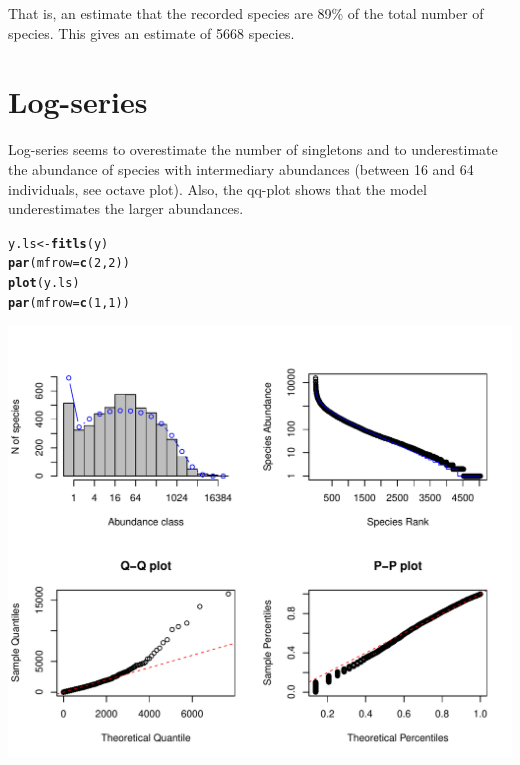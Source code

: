 \documentclass[12pt, A4]{article}\usepackage[]{graphicx}\usepackage[]{color}
\makeatletter
\def\maxwidth{ %
  \ifdim\Gin@nat@width>\linewidth
    \linewidth
  \else
    \Gin@nat@width
  \fi
}
\newcommand{\hlnum}[1]{\textcolor[rgb]{0.686,0.059,0.569}{#1}}%
\newcommand{\hlstd}[1]{\textcolor[rgb]{0.345,0.345,0.345}{#1}}%
\newcommand{\hlkwb}[1]{\textcolor[rgb]{0.69,0.353,0.396}{#1}}%
\newcommand{\hlkwc}[1]{\textcolor[rgb]{0.333,0.667,0.333}{#1}}%
\newcommand{\hlkwd}[1]{\textcolor[rgb]{0.737,0.353,0.396}{\textbf{#1}}}%
\newenvironment{kframe}{%
 \def\at@end@of@kframe{}%
 \ifinner\ifhmode%
  \def\at@end@of@kframe{\end{minipage}}%
  \begin{minipage}{\columnwidth}%
 \fi\fi%
 \def\FrameCommand##1{\hskip\@totalleftmargin \hskip-\fboxsep
 \colorbox{shadecolor}{##1}\hskip-\fboxsep
     \hskip-\linewidth \hskip-\@totalleftmargin \hskip\columnwidth}%
 \MakeFramed {\advance\hsize-\width
   \@totalleftmargin\z@ \linewidth\hsize
   \@setminipage}}%
 {\par\unskip\endMakeFramed%
 \at@end@of@kframe}
\newenvironment{knitrout}{}{} %
\makeatother
\begin{document}
That is, an estimate that the recorded species are 89\%
of the total number of species.
This gives an estimate of 5668 species.


\section{Log-series}

Log-series seems to overestimate the number of singletons
and to underestimate the abundance of species with intermediary abundances
(between 16 and 64 individuals, see octave plot). Also, the qq-plot shows that
the model underestimates the larger abundances.

 
\begin{knitrout}
\color{fgcolor}\begin{kframe}
\begin{alltt}
\hlstd{y.ls} \hlkwb{<-} \hlkwd{fitls}\hlstd{(y)}
\hlkwd{par}\hlstd{(}\hlkwc{mfrow}\hlstd{=}\hlkwd{c}\hlstd{(}\hlnum{2}\hlstd{,}\hlnum{2}\hlstd{))}
\hlkwd{plot}\hlstd{(y.ls)}
\hlkwd{par}\hlstd{(}\hlkwc{mfrow}\hlstd{=}\hlkwd{c}\hlstd{(}\hlnum{1}\hlstd{,}\hlnum{1}\hlstd{))}
\end{alltt}
\end{kframe}

{\centering \includegraphics[width=\maxwidth]{figure/fit_ls-1} 

}



\end{knitrout}
\end{document}
